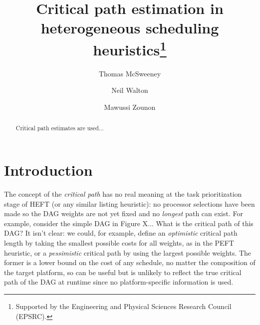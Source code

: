 \documentclass[runningheads]{llncs}
\begin{document}
%
\title{Critical path estimation in heterogeneous scheduling heuristics\thanks{Supported by the Engineering and Physical Sciences Research Council (EPSRC).}}
%
%
\author{Thomas McSweeney \and Neil Walton \and Mawussi Zounon }
%
%

%
\maketitle              %
%
\begin{abstract}

Critical path estimates are used...


\end{abstract}


\section{Introduction}
\label{sect.intro}

The concept of the {\em critical path} has no real meaning at the task prioritization stage of HEFT (or any similar listing heuristic): no processor selections have been made so the DAG weights are not yet fixed and no {\em longest} path can exist. For example, consider the simple DAG in Figure X... What is the critical path of this DAG? It isn't clear: we could, for example, define an {\em optimistic} critical path length by taking the smallest possible costs for all weights, as in the PEFT heuristic, or a {\em pessimistic} critical path by using the largest possible weights. The former is a lower bound on the cost of any schedule, no matter the composition of the target platform, so can be useful but is unlikely to reflect the true critical path of the DAG at runtime since no platform-specific information is used.
\end{document}
